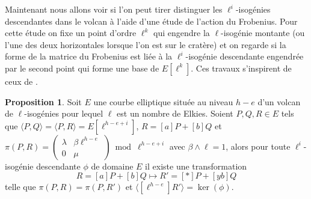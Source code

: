 \documentclass[10pt,a4paper]{book}
\theoremstyle{plain}
\theoremstyle{definition}
\theoremstyle{definition}
\theoremstyle{definition}
\newtheorem{prop}[thm]{Proposition}
\theoremstyle{definition}
\theoremstyle{remark}
\theoremstyle{remark}
\theoremstyle{definition}
\begin{document}
Maintenant nous allons voir si l'on peut tirer distinguer les 
$\ell^i$-isogénies descendantes dans le volcan à l'aide d'une étude de l'action
du Frobenius. Pour cette étude on fixe un point d'ordre $\ell^k$ qui engendre 
la $\ell$-isogénie montante (ou l'une des deux horizontales lorsque l'on est 
sur le cratère) et on regarde si la forme de la matrice du Frobenius est liée à
la $\ell^i$-isogénie descendante engendrée par le second point qui forme une 
base de $E[\ell^k]$.  Ces travaux s'inspirent de ceux de \cite[Chapitre 6]{Master13}.


\begin{prop}
\label{pro:etu:atk:elk}
Soit $E$ une courbe elliptique située au niveau $h-e$ d'un volcan de 
$\ell$-isogénies pour lequel $\ell$ est un nombre de Elkies. Soient $P,Q, R 
\in E$ tels que $\langle P,Q \rangle= \langle P,R \rangle =E[\ell^{h-e+i}]$, 
$R=[a]P+[b]Q$ et $\pi(P,R)= \left( \begin{matrix}\lambda & \beta 
\ell^{h-e} \\0 & \mu \end{matrix}\right) \bmod \ell^{h-e+i}$ avec $\beta \wedge
\ell=1$, alors pour toute $\ell^i$-isogénie descendante $\phi$ de domaine $E$ il
existe une transformation \begin{equation*}
R=[a]P+[b]Q \mapsto R'=[*]P+[yb]Q
\end{equation*}
telle que $\pi(P,R)=\pi(P,R')$ et $\langle [\ell^{h-e}]R' \rangle = \ker(\phi)$.
\end{prop}
\end{document}
